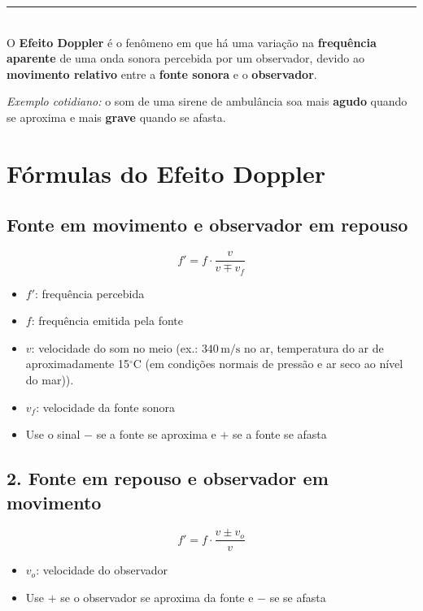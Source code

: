 \documentclass[a4paper,12pt]{article}
\begin{document}
\noindent\rule{\linewidth}{0.6pt}\\

O \textbf{Efeito Doppler} é o fenômeno em que há uma variação na \textbf{frequência aparente} de uma onda sonora percebida por um observador, devido ao \textbf{movimento relativo} entre a \textbf{fonte sonora} e o \textbf{observador}.

\bigskip

\textit{Exemplo cotidiano:} o som de uma sirene de ambulância soa mais \textbf{agudo} quando se aproxima e mais \textbf{grave} quando se afasta.

\section{Fórmulas do Efeito Doppler}

\subsection{Fonte em movimento e observador em repouso}

\[
f' = f \cdot \frac{v}{v \mp v_f}
\]

\begin{itemize}
  \item \( f' \): frequência percebida
  \item \( f \): frequência emitida pela fonte
  \item \( v \): velocidade do som no meio (ex.: \(340 \, \text{m/s}\) no ar, temperatura do ar de aproximadamente 15$^{\circ}$C (em 
  condições normais de pressão e ar seco ao nível do mar)).
  \item \( v_f \): velocidade da fonte sonora
  \item Use o sinal \(-\) se a fonte se aproxima e \(+\) se a fonte se afasta
\end{itemize}

\subsection{2. Fonte em repouso e observador em movimento}

\[
f' = f \cdot \frac{v \pm v_o}{v}
\]

\begin{itemize}
  \item \( v_o \): velocidade do observador
  \item Use \(+\) se o observador se aproxima da fonte e \(-\) se se afasta
\end{itemize}
\end{document}

